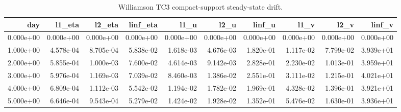 \begin{table}[htbp]
\centering
{}
\begin{tabular}{rrrrrrrrrr}
\toprule
day & l1\_eta & l2\_eta & linf\_eta & l1\_u & l2\_u & linf\_u & l1\_v & l2\_v & linf\_v \\
\midrule
0.000e+00 & 0.000e+00 & 0.000e+00 & 0.000e+00 & 0.000e+00 & 0.000e+00 & 0.000e+00 & 0.000e+00 & 0.000e+00 & 0.000e+00 \\
1.000e+00 & 4.578e-04 & 8.705e-04 & 5.838e-02 & 1.618e-03 & 4.676e-03 & 1.820e-01 & 1.117e-02 & 7.799e-02 & 3.939e+01 \\
2.000e+00 & 5.855e-04 & 1.000e-03 & 7.600e-02 & 4.614e-03 & 9.142e-03 & 2.828e-01 & 2.230e-02 & 1.013e-01 & 3.959e+01 \\
3.000e+00 & 5.976e-04 & 1.169e-03 & 7.039e-02 & 8.460e-03 & 1.386e-02 & 2.551e-01 & 3.111e-02 & 1.215e-01 & 4.021e+01 \\
4.000e+00 & 6.809e-04 & 1.112e-03 & 5.542e-02 & 1.194e-02 & 1.782e-02 & 1.969e-01 & 4.328e-02 & 1.396e-01 & 3.921e+01 \\
5.000e+00 & 6.646e-04 & 9.543e-04 & 5.279e-02 & 1.424e-02 & 1.928e-02 & 1.352e-01 & 5.476e-02 & 1.630e-01 & 3.936e+01 \\
\bottomrule
\end{tabular}
\caption{Williamson TC3 compact-support steady-state drift.}
\end{table}
